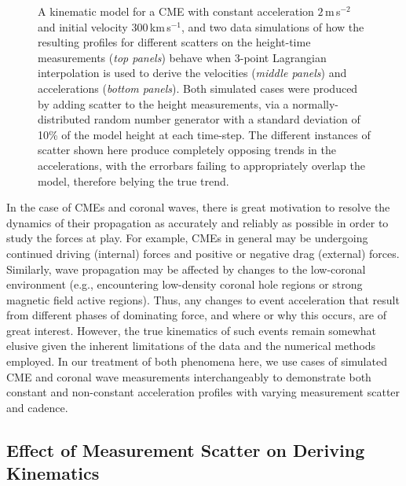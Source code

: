 \documentclass[structabstract]{aa}
\begin{document}
\begin{figure}[!t]
\caption{A kinematic model for a CME with constant acceleration $2$\,m\,s$^{-2}$ and initial velocity $300$\,km\,s$^{-1}$, and two data simulations of how the resulting profiles for different scatters on the height-time measurements (\emph{top panels}) behave when 3-point Lagrangian interpolation is used to derive the velocities (\emph{middle panels}) and accelerations (\emph{bottom panels}). Both simulated cases were produced by adding scatter to the height measurements, via a normally-distributed random number generator with a standard deviation of 10\% of the model height at each time-step. The different instances of scatter shown here produce completely opposing trends in the accelerations, with the errorbars failing to appropriately overlap the model, therefore belying the true trend.}
\label{sim_vels_thesis}
\end{figure}


In the case of CMEs and coronal waves, there is great motivation to resolve the dynamics of their propagation as accurately and reliably as possible in order to study the forces at play. For example, CMEs in general may be undergoing continued driving (internal) forces and positive or negative drag (external) forces. Similarly, wave propagation may be affected by changes to the low-coronal environment (e.g., encountering low-density coronal hole regions or strong magnetic field active regions). Thus, any changes to event acceleration that result from different phases of dominating force, and where or why this occurs, are of great interest. However, the true kinematics of such events remain somewhat elusive given the inherent limitations of the data and the numerical methods employed. In our treatment of both phenomena here, we use cases of simulated CME and coronal wave measurements interchangeably to demonstrate both constant and non-constant acceleration profiles with varying measurement scatter and cadence.


\subsection{Effect of Measurement Scatter on Deriving Kinematics}
\label{subsect:noise}
\end{document}
